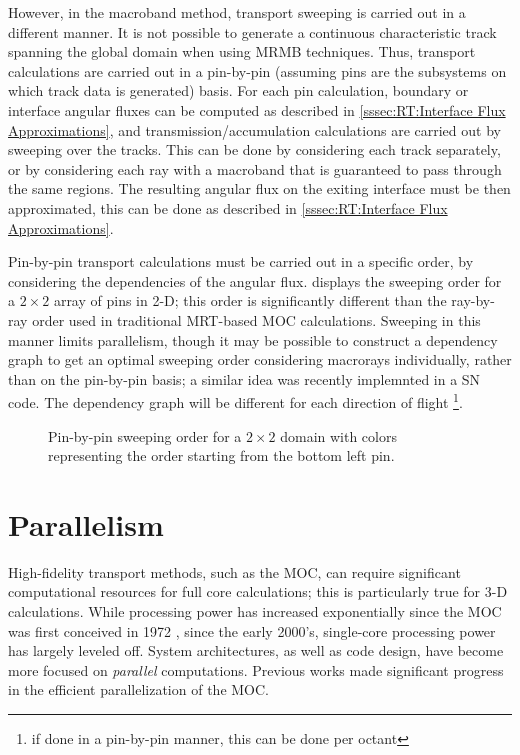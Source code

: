 {{{        However, in the macroband method, transport sweeping is carried out in a different manner.
        It is not possible to generate a continuous characteristic track spanning the global domain when using \ac{MRMB} techniques.
        Thus, transport calculations are carried out in a pin-by-pin (assuming pins are the subsystems on which track data is generated) basis.
        For each pin calculation, boundary or interface angular fluxes can be computed as described in \cref{sssec:RT:Interface Flux Approximations}, and transmission/accumulation calculations are carried out by sweeping over the tracks.
        This can be done by considering each track separately, or by considering each ray with a macroband that is guaranteed to pass through the same regions.
        The resulting angular flux on the exiting interface must be then approximated, this can be done as described in \cref{sssec:RT:Interface Flux Approximations}.

        Pin-by-pin transport calculations must be carried out in a specific order, by considering the dependencies of the angular flux.
         displays the sweeping order for a $2\times2$ array of pins in 2-D; this order is significantly different than the ray-by-ray order used in traditional \ac{MRT}-based \ac{MOC} calculations.
        Sweeping in this manner limits parallelism, though it may be possible to construct a dependency graph to get an optimal sweeping order considering macrorays individually, rather than on the pin-by-pin basis; a similar idea was recently implemnted in a \ac{SN} code\cite{Adams2013}.
        The dependency graph will be different for each direction of flight \footnote{if done in a pin-by-pin manner, this can be done per octant}.

        \begin{figure}[h]
          \centering
          \def\svgwidth{0.45\linewidth}
          
          \caption{Pin-by-pin sweeping order for a $2\times2$ domain with colors representing the order starting from the bottom left pin.}
          \label{fig:RT:Macroband Sweep Order}
        \end{figure}
      }
    }

    \section{Parallelism}{\label{sec:MOC:Parallelism}
        High-fidelity transport methods, such as the \ac{MOC}, can require significant computational resources for full core calculations; this is particularly true for 3-D calculations.
        While processing power has increased exponentially since the \ac{MOC} was first conceived in 1972 \cite{Askew1972}, since the early 2000's, single-core processing power has largely leveled off.
        System architectures, as well as code design, have become more focused on \emph{parallel} computations.
        Previous works \cite{Kochunas2013} made significant progress in the efficient parallelization of the \ac{MOC}.

}}
